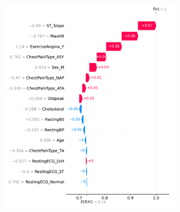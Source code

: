 \begin{figure}
\begin{subfigure}{1\columnwidth}
        \caption{}
        \label{fig:shap_sample_positive_2}
    \end{subfigure}
    \begin{subfigure}{1\columnwidth}
        \includegraphics[width=1\textwidth]{images/shap_sample_positive_3.pdf}
        \caption{}
    \end{subfigure}
    \begin{subfigure}{1\columnwidth}

\end{subfigure}
\end{figure}

